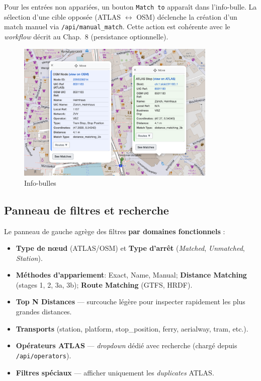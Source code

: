 Pour les entrées non appariées, un bouton \texttt{Match to} apparaît dans l'info-bulle. La sélection d'une cible opposée (ATLAS \(\leftrightarrow\) OSM) déclenche la création d'un match manuel via \texttt{/api/manual\_match}. Cette action est cohérente avec le \textit{workflow} décrit au Chap.~8 (persistance optionnelle).

\begin{figure}[h]
  \centering
  \includegraphics[width=0.85\textwidth]{../figures/chap9/popups.png}
  \caption[Info-bulles]{Info-bulles}
  \label{fig:frontend-popups}
\end{figure}

\subsection{Panneau de filtres et recherche}
Le panneau de gauche agrège des filtres \textbf{par domaines fonctionnels} :
\begin{itemize}
  \item \textbf{Type de nœud} (ATLAS/OSM) et \textbf{Type d'arrêt} (\textit{Matched}, \textit{Unmatched}, \textit{Station}).
  \item \textbf{Méthodes d'appariement}: Exact, Name, Manual; \textbf{Distance Matching} (stages 1, 2, 3a, 3b); \textbf{Route Matching} (GTFS, HRDF).
  \item \textbf{Top N Distances} — surcouche légère pour inspecter rapidement les plus grandes distances.
  \item \textbf{Transports} (station, platform, stop\_position, ferry, aerialway, tram, etc.).
  \item \textbf{Opérateurs ATLAS} — \textit{dropdown} dédié avec recherche (chargé depuis \texttt{/api/operators}).
  \item \textbf{Filtres spéciaux} — afficher uniquement les \textit{duplicates} ATLAS.
\end{itemize}

